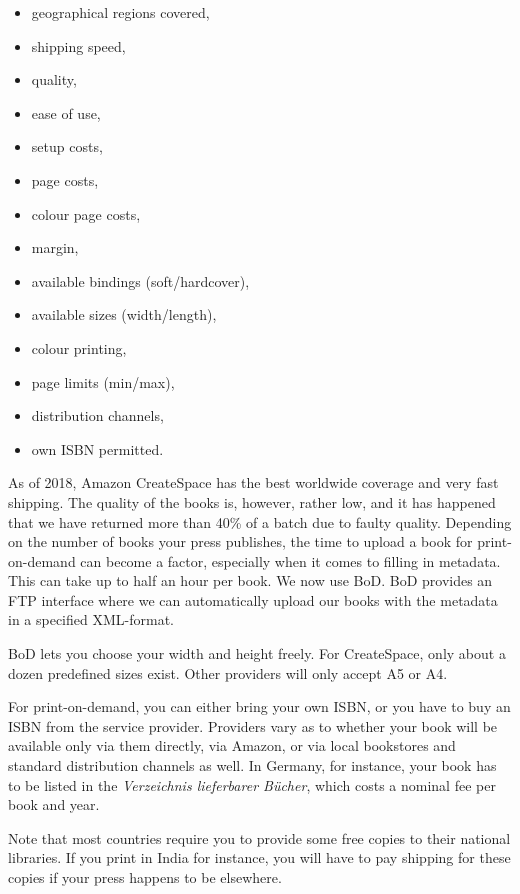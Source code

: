 \documentclass[guidelines,nonflat,modfonts] {langsci/langscibook}
\begin{document}
\begin{itemize}
 \item geographical regions covered, 
 \item shipping speed,
 \item quality,
 \item ease of use, 
 \item setup costs, 
 \item page costs, 
 \item colour page costs, 
 \item margin,
 \item available bindings (soft/hardcover), 
 \item available sizes (width/length), 
 \item colour printing, 
 \item page limits (min/max),
 \item distribution channels,
 \item own ISBN permitted.
\end{itemize}

As of 2018, Amazon CreateSpace has the best worldwide coverage and very fast shipping. The quality of the books is, however, rather low, and it has happened that we have returned more than 40\% of a batch due to faulty quality. Depending on the number of books your press publishes, the time to upload a book for print-on-demand can become a factor, especially when it comes to filling in metadata. This can take up to half  an hour per book. We now use BoD. BoD provides an FTP interface where we can automatically upload our books with the metadata in a specified XML-format. 

BoD lets you choose your width and height freely. For CreateSpace, only about a dozen %
 predefined sizes exist. Other providers will only accept A5 or A4. 

For print-on-demand, you can either bring your own ISBN, or you have to buy an ISBN from the service provider. Providers vary as to whether your book will be available only via them directly, via Amazon, or via local bookstores and standard distribution channels as well. In Germany, for instance, your book has to be listed in the \textit{Verzeichnis lieferbarer Bücher}, which costs a nominal fee per book and year.

Note that most countries require you to provide some free copies to their national libraries. If you print in India for instance, you will have to pay shipping for these copies if your press happens to be elsewhere.
\end{document}
